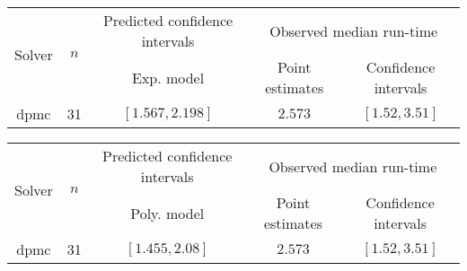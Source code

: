 \begin{tabular}{ccccc}
\hline 
\multirow{2}{*}{Solver} & \multirow{2}{*}{$n$} & Predicted confidence intervals & \multicolumn{2}{c}{Observed median  run-time}\tabularnewline
 &  & Exp. model  & Point estimates  & Confidence intervals\tabularnewline
\hline 
\hline 
\multirow{0}{*}{dpmc} & 31 & $\mathbf{\left[1.567,2.198\right]}$ & $2.573$ & $\left[1.52,3.51\right]$ \tabularnewline 
\hline 
\end{tabular} 

\begin{tabular}{ccccc}
\hline 
\multirow{2}{*}{Solver} & \multirow{2}{*}{$n$} & Predicted confidence intervals & \multicolumn{2}{c}{Observed median  run-time}\tabularnewline
 &  & Poly. model  & Point estimates  & Confidence intervals\tabularnewline
\hline 
\hline 
\multirow{0}{*}{dpmc} & 31 & $\mathbf{\left[1.455,2.08\right]}$ & $2.573$ & $\left[1.52,3.51\right]$ \tabularnewline 
\hline 
\end{tabular} 


